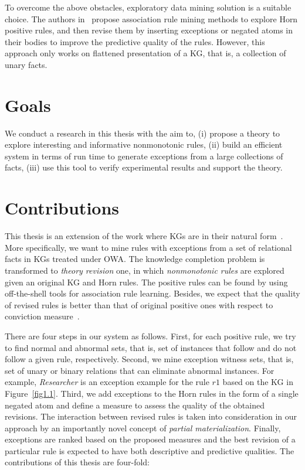 To overcome the above obstacles, exploratory data mining solution is a suitable choice. The authors in~\cite{ref12} propose association rule mining methods to explore Horn positive rules, and then revise them by inserting exceptions or negated atoms in their bodies to improve the predictive quality of the rules. However, this approach only works on flattened presentation of a KG, that is, a collection of unary facts.

\section{Goals}

We conduct a research in this thesis with the aim to, (i) propose a theory to explore interesting and informative nonmonotonic rules, (ii) build an efficient system in terms of run time to generate exceptions from a large collections of facts, (iii) use this tool to verify experimental results and support the theory.

\section{Contributions}

This thesis is an extension of the work where KGs are in their natural form~\cite{ref12}. More specifically, we want to mine rules with exceptions from a set of relational facts in KGs treated under OWA. The knowledge completion problem is transformed to \textit{theory revision} one, in which \textit{nonmonotonic rules} are explored given an original KG and Horn rules. The positive rules can be found by using off-the-shell tools for association rule learning. Besides, we expect that the quality of revised rules is better than that of original positive ones with respect to conviction measure~\cite{ref48}.

There are four steps in our system as follows. First, for each positive rule, we try to find normal and abnormal sets, that is, set of instances that follow and do not follow a given rule, respectively. Second, we mine exception witness sets, that is, set of unary or binary relations that can eliminate abnormal instances. For example, \textit{Researcher} is an exception example for the rule $r1$ based on the KG in Figure~\ref{fig1.1}. Third, we add exceptions to the Horn rules in the form of a single negated atom and define a measure to assess the quality of the obtained revisions. The interaction between revised rules is taken into consideration in our approach by an importantly novel concept of \textit{partial materialization}. Finally, exceptions are ranked based on the proposed measures and the best revision of a particular rule is expected to have both descriptive and predictive qualities. The contributions of this thesis are four-fold:

